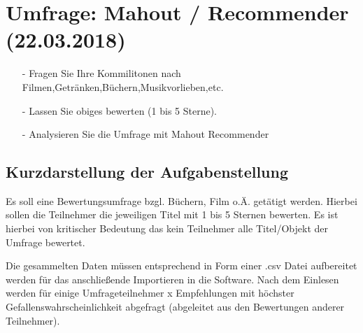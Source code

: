\section{Umfrage: Mahout / Recommender (22.03.2018)}
\begin{itemize}
\item[-] Fragen Sie Ihre Kommilitonen nach Filmen,Getränken,Büchern,Musikvorlieben,etc.
\item[-] Lassen Sie obiges bewerten (1 bis 5 Sterne).
\item[-] Analysieren Sie die Umfrage mit Mahout Recommender
\end{itemize}

\subsection*{Kurzdarstellung der Aufgabenstellung}
Es soll eine Bewertungsumfrage bzgl. Büchern, Film o.Ä. getätigt werden. Hierbei sollen die Teilnehmer die jeweiligen Titel mit 1 bis 5 Sternen bewerten. Es ist hierbei von kritischer Bedeutung das kein Teilnehmer alle Titel/Objekt der Umfrage bewertet.

Die gesammelten Daten müssen entsprechend in Form einer .csv Datei aufbereitet werden für das anschließende Importieren in die Software. Nach dem Einlesen werden für einige Umfrageteilnehmer x Empfehlungen mit höchster Gefallenswahrscheinlichkeit abgefragt (abgeleitet aus den Bewertungen anderer Teilnehmer).

